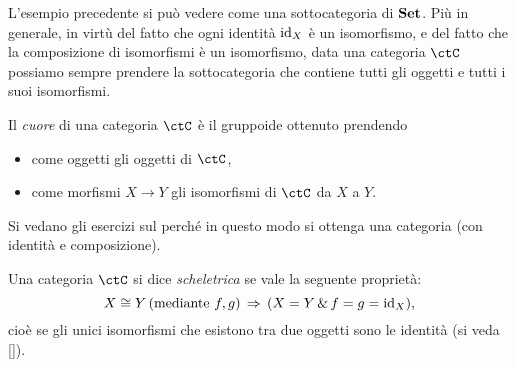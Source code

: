 L'esempio precedente si può vedere come una sottocategoria di \(\mathbf{Set}\).
Più in generale, in virtù del fatto che ogni identità \(\mathrm{id}_X\) è un isomorfismo, e del fatto che la composizione di isomorfismi è un isomorfismo, data una categoria \(\ctC\) possiamo sempre prendere la sottocategoria che contiene tutti gli oggetti e tutti i suoi isomorfismi.
\begin{definition}
	Il \emph{cuore} di una categoria \(\ctC\) è il gruppoide ottenuto prendendo
	\begin{itemize}
		\item come oggetti gli oggetti di \(\ctC\),
		\item come morfismi \(X\to Y\) gli isomorfismi di \(\ctC\) da \(X\) a \(Y\).
	\end{itemize}
\end{definition}

Si vedano gli esercizi sul perché in questo modo si ottenga una categoria (con identità e composizione).

\begin{definition}\label{def_cat_scheletrica}
	Una categoria \(\ctC\) si dice \emph{scheletrica} se vale la seguente proprietà:
	\[X\cong Y \, (\text{mediante } f,g) \,\Rightarrow\, (X=Y \,\&\, f=g=\mathrm{id}_X),\]
	cioè se gli unici isomorfismi che esistono tra due oggetti sono le identità (si veda \ref{}).
\end{definition}
